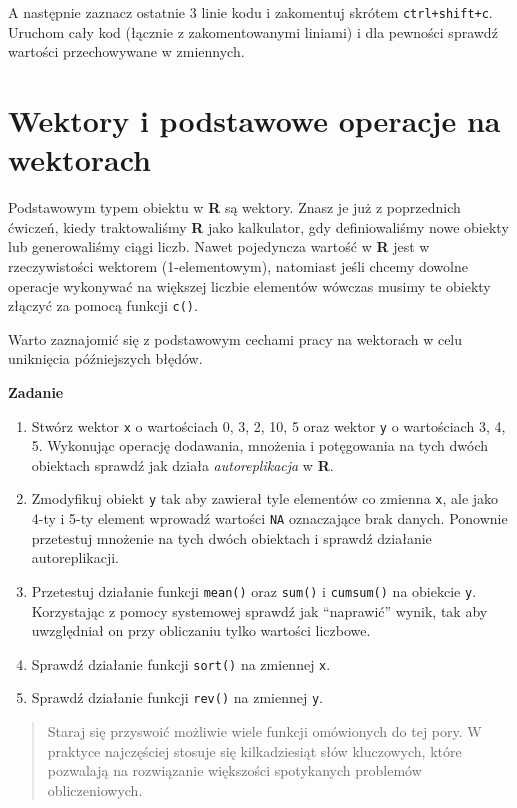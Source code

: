 \documentclass[]{book}
\providecommand{\tightlist}{%
  \setlength{\itemsep}{0pt}\setlength{\parskip}{0pt}}
\theoremstyle{definition}
\theoremstyle{definition}
\theoremstyle{definition}
\theoremstyle{remark}
\begin{document}
A następnie zaznacz ostatnie 3 linie kodu i zakomentuj skrótem
\texttt{ctrl+shift+c}. Uruchom cały kod (łącznie z zakomentowanymi
liniami) i dla pewności sprawdź wartości przechowywane w zmiennych.

\section{Wektory i podstawowe operacje na
wektorach}\label{wektory-i-podstawowe-operacje-na-wektorach}

Podstawowym typem obiektu w \textbf{R} są wektory. Znasz je już z
poprzednich ćwiczeń, kiedy traktowaliśmy \textbf{R} jako kalkulator, gdy
definiowaliśmy nowe obiekty lub generowaliśmy ciągi liczb. Nawet
pojedyncza wartość w \textbf{R} jest w rzeczywistości wektorem
(1-elementowym), natomiast jeśli chcemy dowolne operacje wykonywać na
większej liczbie elementów wówczas musimy te obiekty złączyć za pomocą
funkcji \texttt{c()}.

Warto zaznajomić się z podstawowym cechami pracy na wektorach w celu
uniknięcia późniejszych błędów.

\textbf{Zadanie}

\begin{enumerate}
\def\labelenumi{\arabic{enumi}.}
\tightlist
\item
  Stwórz wektor \texttt{x} o wartościach 0, 3, 2, 10, 5 oraz wektor
  \texttt{y} o wartościach 3, 4, 5. Wykonując operację dodawania,
  mnożenia i potęgowania na tych dwóch obiektach sprawdź jak działa
  \emph{autoreplikacja} w \textbf{R}.
\item
  Zmodyfikuj obiekt \texttt{y} tak aby zawierał tyle elementów co
  zmienna \texttt{x}, ale jako 4-ty i 5-ty element wprowadź wartości
  \texttt{NA} oznaczające brak danych. Ponownie przetestuj mnożenie na
  tych dwóch obiektach i sprawdź działanie autoreplikacji.
\item
  Przetestuj działanie funkcji \texttt{mean()} oraz \texttt{sum()} i
  \texttt{cumsum()} na obiekcie \texttt{y}. Korzystając z pomocy
  systemowej sprawdź jak ``naprawić'' wynik, tak aby uwzględniał on przy
  obliczaniu tylko wartości liczbowe.
\item
  Sprawdź działanie funkcji \texttt{sort()} na zmiennej \texttt{x}.
\item
  Sprawdź działanie funkcji \texttt{rev()} na zmiennej \texttt{y}.
\end{enumerate}

\begin{quote}
Staraj się przyswoić możliwie wiele funkcji omówionych do tej pory. W
praktyce najczęściej stosuje się kilkadziesiąt słów kluczowych, które
pozwalają na rozwiązanie większości spotykanych problemów
obliczeniowych.
\end{quote}
\end{document}
